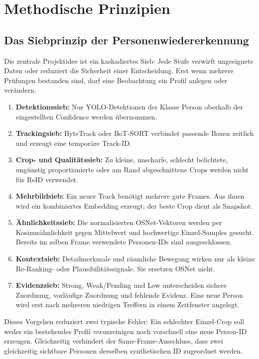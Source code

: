 \section{Methodische Prinzipien}

\subsection{Das Siebprinzip der Personenwiedererkennung}

Die zentrale Projektidee ist ein kaskadiertes Sieb: Jede Stufe verwirft
ungeeignete Daten oder reduziert die Sicherheit einer Entscheidung. Erst wenn
mehrere Prüfungen bestanden sind, darf eine Beobachtung ein Profil anlegen oder
verändern.

\begin{enumerate}[label=\textbf{S\arabic*:},leftmargin=18mm,itemsep=4pt]
  \item \textbf{Detektionssieb:} Nur YOLO-Detektionen der Klasse Person oberhalb
    der eingestellten Confidence werden übernommen.
  \item \textbf{Trackingsieb:} ByteTrack oder BoT-SORT verbindet passende Boxen
    zeitlich und erzeugt eine temporäre Track-ID.
  \item \textbf{Crop- und Qualitätssieb:} Zu kleine, unscharfe, schlecht
    belichtete, ungünstig proportionierte oder am Rand abgeschnittene Crops
    werden nicht für ReID verwendet.
  \item \textbf{Mehrbildsieb:} Ein neuer Track benötigt mehrere gute Frames.
    Aus ihnen wird ein kombiniertes Embedding erzeugt; der beste Crop dient als
    Snapshot.
  \item \textbf{Ähnlichkeitssieb:} Die normalisierten OSNet-Vektoren werden per
    Kosinusähnlichkeit gegen Mittelwert und hochwertige Einzel-Samples gesucht.
    Bereits im selben Frame verwendete Personen-IDs sind ausgeschlossen.
  \item \textbf{Kontextsieb:} Detailmerkmale und räumliche Bewegung wirken nur
    als kleine Re-Ranking- oder Plausibilitätssignale. Sie ersetzen OSNet nicht.
  \item \textbf{Evidenzsieb:} Strong, Weak/Pending und Low unterscheiden sichere
    Zuordnung, vorläufige Zuordnung und fehlende Evidenz. Eine neue Person wird
    erst nach mehreren niedrigen Treffern in einem Zeitfenster angelegt.
\end{enumerate}

Dieses Vorgehen reduziert zwei typische Fehler: Ein schlechter Einzel-Crop soll
weder ein bestehendes Profil verunreinigen noch vorschnell eine neue Person-ID
erzeugen. Gleichzeitig verhindert der Same-Frame-Ausschluss, dass zwei
gleichzeitig sichtbare Personen derselben synthetischen ID zugeordnet werden.

